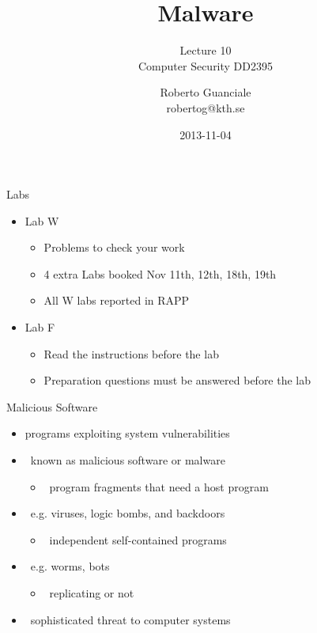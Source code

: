 \documentclass{beamer}
\title{Malware}
\subtitle{Lecture 10 \\ Computer Security DD2395}
\author[R. Guanciale]{
  Roberto Guanciale\\
  robertog@kth.se
}
\date{2013-11-04}
\begin{document}
\begin{frame}[plain]
  \titlepage
\end{frame}

\begin{frame}{Labs}
  \begin{itemize}
  \item Lab W
    \begin{itemize}
      \item Problems to check your work
      \item 4 extra Labs booked Nov 11th, 12th, 18th, 19th
      \item All W labs reported in RAPP
    \end{itemize}
  \item Lab F
    \begin{itemize}
      \item Read the instructions before the lab
      \item Preparation questions must be answered before the lab
    \end{itemize}
  \end{itemize}
\end{frame}

\begin{frame}{Malicious Software}
  \begin{itemize}
  \item programs exploiting system vulnerabilities 
  \item  known as malicious software or malware 
    \begin{itemize}
    \item  program fragments that need a host program  
    \end{itemize}
  \item  e.g. viruses, logic bombs, and backdoors 
    \begin{itemize}
    \item  independent self-contained programs 
    \end{itemize}
  \item  e.g. worms, bots 
    \begin{itemize}
    \item  replicating or not 
    \end{itemize}
  \item  sophisticated threat to computer systems 
  \end{itemize}
\end{frame}
\end{document}
